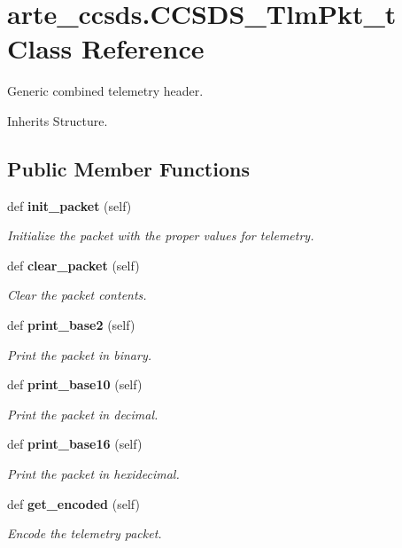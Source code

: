 \section{arte\+\_\+ccsds.\+C\+C\+S\+D\+S\+\_\+\+Tlm\+Pkt\+\_\+t Class Reference}
\label{classarte__ccsds_1_1_c_c_s_d_s___tlm_pkt__t}


Generic combined telemetry header.  




Inherits Structure.

\subsection*{Public Member Functions}
\begin{DoxyCompactItemize}
\item 
def {\bf init\+\_\+packet} (self)
\begin{DoxyCompactList}\small\item\em Initialize the packet with the proper values for telemetry. \end{DoxyCompactList}\item 
def {\bf clear\+\_\+packet} (self)
\begin{DoxyCompactList}\small\item\em Clear the packet contents. \end{DoxyCompactList}\item 
def {\bf print\+\_\+base2} (self)
\begin{DoxyCompactList}\small\item\em Print the packet in binary. \end{DoxyCompactList}\item 
def {\bf print\+\_\+base10} (self)
\begin{DoxyCompactList}\small\item\em Print the packet in decimal. \end{DoxyCompactList}\item 
def {\bf print\+\_\+base16} (self)
\begin{DoxyCompactList}\small\item\em Print the packet in hexidecimal. \end{DoxyCompactList}\item 
def {\bf get\+\_\+encoded} (self)
\begin{DoxyCompactList}\small\item\em Encode the telemetry packet. \end{DoxyCompactList}\item 

\end{DoxyCompactItemize}

